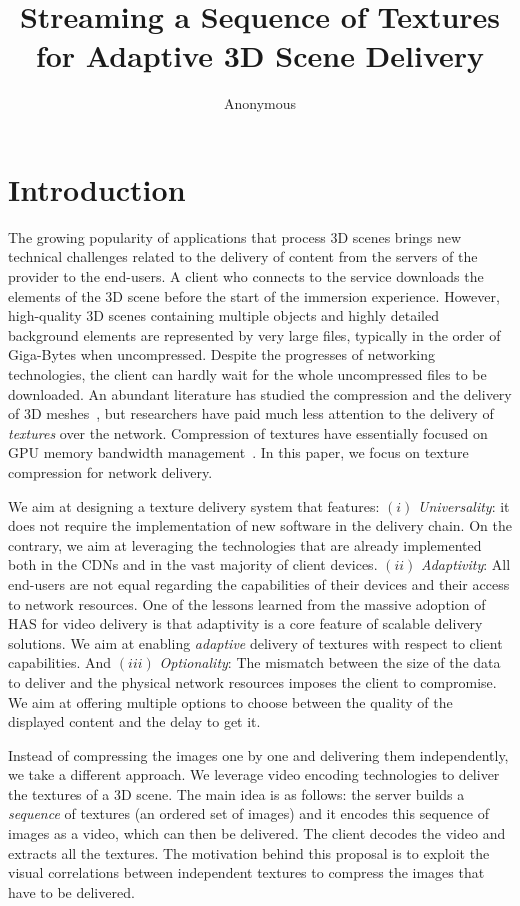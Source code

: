 \documentclass{vgtc}                          %
\title{Streaming a Sequence of Textures for Adaptive 3D Scene Delivery}
\author{Anonymous}
\begin{document}
\maketitle

\section{Introduction}

The growing popularity of applications that process 3D scenes brings new technical challenges related to the delivery of content from the servers 
of the provider to the end-users. A client who connects to the service downloads the elements of the 3D
scene before the start of the immersion experience. However, high-quality 3D scenes containing multiple objects and highly detailed background elements are represented by very large files, typically in the order of Giga-Bytes when uncompressed. Despite the progresses of networking technologies, the client can hardly wait for the whole uncompressed files to be downloaded. An abundant literature has studied the compression and the delivery of 3D meshes~\cite{MagloLDH15}, but researchers have paid much less attention to the delivery of \emph{textures} over the network. Compression of textures have essentially focused on \gls{GPU} memory bandwidth management~\cite{RodriguezGGMMPS14}. In this paper, we focus on texture compression for network delivery.

We aim at designing a texture delivery system that features: $(i)$ \emph{Universality}: it does not require the implementation of new software in the delivery chain. On the contrary, we aim at leveraging the technologies that are already implemented both in the \glspl{CDN} and in the vast majority of client devices. $(ii)$ \emph{Adaptivity}: All end-users are not equal regarding the capabilities of their devices and their access to network resources. One of the lessons learned from the massive adoption of \gls{HAS} for video delivery is that adaptivity is a core feature of scalable delivery solutions. We aim at enabling \emph{adaptive} delivery of textures with respect to client capabilities. And $(iii)$ \emph{Optionality}: The mismatch between the size of the data to deliver and the physical network resources imposes the client to compromise. We aim at offering multiple options to choose between the quality of the displayed content and the delay to get it.

Instead of compressing the images one by one and delivering them independently, we take a different approach. We leverage video encoding technologies to deliver the textures of a 3D scene. The main idea is as follows: the server builds a \emph{sequence} of textures (an ordered set of images) and it encodes this sequence of images as a video, which can then be delivered. The client decodes the video and extracts all the textures. The motivation behind this proposal is to exploit the visual correlations between independent textures to compress the images that have to be delivered.
\end{document}
